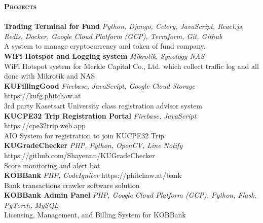 \documentclass[a4paper]{article}
\newcommand{\lineunder} {
    \vspace*{-8pt} \\
    \hspace*{-18pt} \hrulefill \\
}
\newcommand{\header} [1] {
    {\hspace*{-18pt}\vspace*{6pt} \textsc{\textbf{#1}}}
    \vspace*{-6pt} \lineunder
}
\begin{document}
\header{Projects}
{\textbf{Trading Terminal for Fund}} {\sl Python, Django, Celery, JavaScript, React.js, Redis, Docker, Google Cloud Platform (GCP), Terraform, Git, Github} \\
A system to manage cryptocurrency and token of fund company.\\
\vspace*{2mm}
{\textbf{WiFi Hotspot and Logging system}} {\sl Mikrotik, Synology NAS} \\
WiFi Hotspot system for Merkle Capital Co., Ltd. which collect traffic log and all done with Mikrotik and NAS\\
\vspace*{2mm}
{\textbf{KUFillingGood}} {\sl Firebase, JavaScript, Google Cloud Storage} \hfill https://kufg.phitchaw.at\\
3rd party Kasetsart University class registration advisor system\\
\vspace*{2mm}
{\textbf{KUCPE32 Trip Registration Portal}} {\sl Firebase, JavaScript} \hfill https://cpe32trip.web.app\\
AIO System for registration to join KUCPE32 Trip\\
\vspace*{2mm}
{\textbf{KUGradeChecker}} {\sl PHP, Python, OpenCV, Line Notify} \hfill https://github.com/Shayennn/KUGradeChecker\\
Score monitoring and alert bot\\
\vspace*{2mm}
{\textbf{KOBBank}} {\sl PHP, CodeIgniter} \hfill https://phitchaw.at/bank\\
Bank transactions crawler software solution\\
\vspace*{2mm}
{\textbf{KOBBank Admin Panel}} {\sl PHP, Google Cloud Platform (GCP), Python, Flask, PyTorch, MySQL} \\
Licensing, Management, and Billing System for KOBBank\\
\vspace*{2mm}
\end{document}
